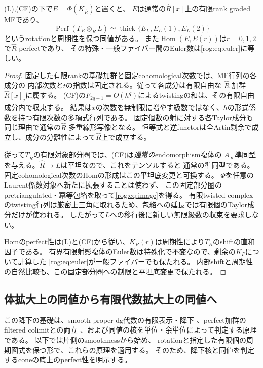 \begin{lemma}[有限対象への制限とLaurent局所化]\label{rog:lem:localization}
\textup{(L),(CF)}の下で$E=\Phi(K_{\widehat R})$と置くと、
$E$は通常の$\widehat R[x]$上の有限rank graded MFであり、
\[
 \operatorname{Perf}(\Gamma_R\otimes_RL)
 \simeq\operatorname{thick}\{E_L,E_L(1),E_L(2)\}
 \tag{RO8}\label{rog:eq:image}
\]
というrotationと周期性を保つ同値がある。
また$\operatorname{Hom}(E,E(r))$は$r=0,1,2$で$\widehat R$-perfectであり、
その特殊・一般ファイバー間のEuler数は\eqref{rog:eq:euler}に等しい。
\end{lemma}
\begin{proof}
固定した有限rankの基礎加群と固定cohomological次数では、MF行列の各成分の
内部次数と$t$の指数は固定される。従って各成分は有限自由な
$\widehat R$-加群$\widehat R[x]_j$に属する。
(CF)の$F_{2q+1}=O(h^q)$によるtwistingの和は、その有限自由成分内で収束する。
結果は$x$の次数を無制限に増やす級数ではなく、$h$の形式係数を持つ有限次数の多項式行列である。
固定個数の射に対する各Taylor成分も同じ理由で通常の$\widehat R$-多重線形写像となる。
恒等式と逆functorは全Artin剰余で成立し、成分の分離性によって$\widehat R$上で成立する。

従って$T_{\widehat R}$の有限対象部分圏では、(CF)は\emph{通常の}endomorphism複体の
$A_\infty$準同型を与える。$\widehat R\to L$は平坦なので、これをテンソルすると
通常の準同型である。固定cohomological次数のHomの形成はこの平坦底変更と可換する。
$\Phi$を任意のLaurent係数対象へ新たに拡張することは使わず、
この固定部分圏のpretriangulated・冪等包絡を取って\eqref{rog:eq:image}を得る。
有限twisted complexのtwisting行列は厳密上三角に取れるため、包絡への延長では有限個のTaylor成分だけが使われる。
したがって$L$への移行後に新しい無限級数の収束を要求しない。

Homのperfect性は(L)と(CF)から従い、$K_R(r)$は周期性により$T_R$のshiftの直和因子である。
有界有限射影複体のEuler数は特殊化で不変なので、剰余の$K_F$について計算した
\eqref{rog:eq:euler}が一般ファイバーでも保たれる。
内部shiftと周期性の自然比較も、この固定部分圏への制限と平坦底変更で保たれる。
\end{proof}

\subsection{体拡大上の同値から有限代数拡大上の同値へ}

この降下の基礎は、smooth proper dg代数の有限表示・降下
\cite[Th\'eor\`eme~1]{ROGToenDefinition}、perfect加群のfiltered colimitとの両立
\cite[Lemma~2.10]{ROGTV}、および同値の核を単位・余単位によって判定する原理
\cite[Lemma~3.25]{ROGTV}である。
以下では片側のsmoothnessから始め、
rotationと指定した有限個の周期図式を保つ形で、これらの原理を適用する。
そのため、降下核と同値を判定するconeの底上のperfect性を明示する。

